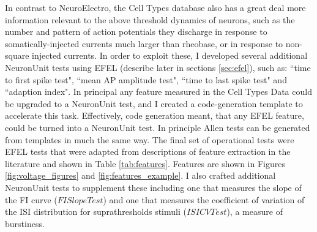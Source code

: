 In contrast to NeuroElectro, the Cell Types database also has a great deal more information relevant to the above threshold dynamics of neurons, such as the number and pattern of action potentials they discharge in response to somatically-injected currents much larger than rheobase, or in response to non-square injected currents.
In order to exploit these, I developed several additional NeuronUnit tests using EFEL (describe later in sections \ref{sec:efel}), such as: ``time to first spike test", ``mean AP amplitude test", ``time to last spike test" and ``adaption index". In principal any feature measured in the Cell Types Data could be upgraded to a NeuronUnit test, and I created a code-generation template to accelerate this task. Effectively, code generation meant, that any EFEL feature, could be turned into a NeuronUnit test. In principle Allen tests can be generated from templates in much the same way. The final set of operational tests
were EFEL \cite{EFEL} tests that were adapted from descriptions of feature extraction in the literature and shown in Table \ref{tab:features}. 
Features are shown in Figures \ref{fig:voltage_figures} and \ref{fig:features_example}.
I also crafted additional NeuronUnit tests to supplement these including one that measures the slope of the FI curve ($FISlopeTest$) and one that measures the coefficient of variation of the ISI distribution for suprathresholds stimuli ($ISICVTest$), a measure of burstiness. 




